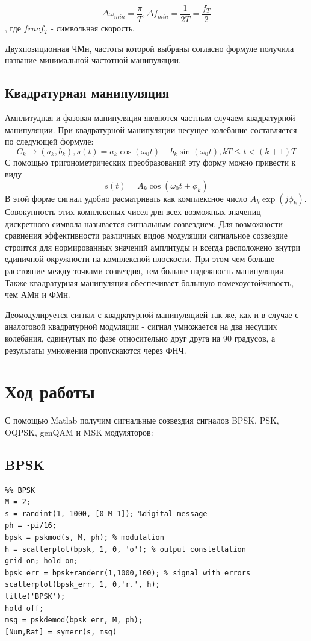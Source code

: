 \documentclass[a4paper,14pt]{article}
\begin{document}
$$
\Delta \omega_{min} = \frac{\pi}{T}, \Delta f_{min} = \frac{1}{2T}=\frac{f_T}{2}
$$, где $ frac{f_T} $ - символьная скорость.

Двухпозиционная ЧМн, частоты которой выбраны согласно формуле получила название минимальной частотной манипуляции.

\subsection{Квадратурная манипуляция}

Амплитудная и фазовая манипуляция являются частным случаем квадратурной манипуляции. При квадратурной манипуляции несущее колебание составляется по следующей формуле:
$$
C_k \rightarrow (a_k, b_k), s(t) = a_k\cos(\omega_0 t)+ b_k \sin(\omega_0 t), kT \leq t < (k+1)T
$$
С помощью тригонометрических преобразований эту форму можно привести к виду 
$$
s(t) = A_k \cos(\omega_0 t+\phi_k)
$$
В этой форме сигнал удобно расматривать как комплексное число $A_k \exp(j\phi_k)$.  Совокупность этих комплексных чисел для всех возможных значениц дискретного символа называется сигнальным созвездием. Для возможности сравнения эффективности различных видов модуляции сигнальное созвездие строится для нормированных значений амплитуды и всегда расположено внутри единичной окружности на комплексной плоскости. При этом чем больше расстояние между точками созвездия, тем больше надежность манипуляции. Также квадратурная манипуляция обеспечивает большую помехоустойчивость, чем АМн и ФМн.

Деомодулируется сигнал с квадратурной манипуляцией так же, как и в случае с аналоговой квадратурной модуляции - сигнал умножается на два несущих колебания, сдвинутых по фазе относительно друг друга на 90 градусов, а результаты умножения пропускаются через ФНЧ.

\section{Ход работы}

С помощью Matlab получим сигнальные созвездия сигналов BPSK, PSK, OQPSK, genQAM и MSK модуляторов:

\subsection{BPSK}

\begin{lstlisting}
%% BPSK 
M = 2;
s = randint(1, 1000, [0 M-1]); %digital message
ph = -pi/16;
bpsk = pskmod(s, M, ph); % modulation
h = scatterplot(bpsk, 1, 0, 'o'); % output constellation
grid on; hold on;
bpsk_err = bpsk+randerr(1,1000,100); % signal with errors
scatterplot(bpsk_err, 1, 0,'r.', h);
title('BPSK');
hold off;
msg = pskdemod(bpsk_err, M, ph);
[Num,Rat] = symerr(s, msg)
\end{lstlisting}
\end{document}
